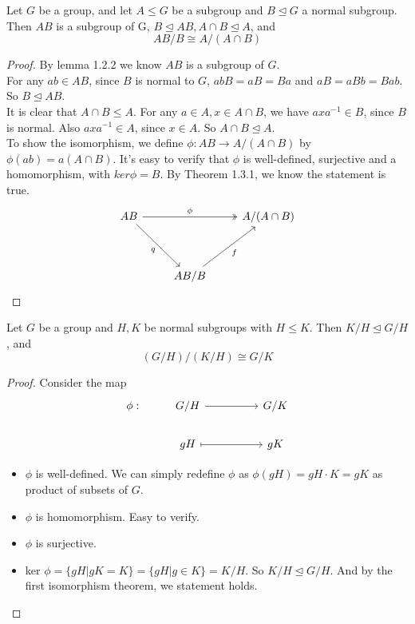 \documentclass[11pt,fleqn]{book} %
\begin{document}
\begin{CJK}{UTF8}{gkai}
\begin{theorem}
	 Let $G$ be a group, and let $A \leq G$ be a subgroup and $B \unlhd G$ a normal subgroup. Then $AB$ is a subgroup of G, $B \unlhd AB, A\cap B \unlhd A$, and 
	\[AB/B \cong A/(A\cap B)\]
\end{theorem}
\begin{proof}
	By lemma 1.2.2 we know $AB$ is a subgroup of $G$. \\
	For any $ab \in AB$, since $B$ is normal to $G$, $abB = aB = Ba$ and $aB = aBb = Bab$. So $B \unlhd AB$. \\
	It is clear that $A\cap B \leq A$. For any $a \in A, x \in A\cap B$, we have $axa^{-1} \in B$, since $B$ is normal. Also $axa^{-1} \in A$, since $x \in A$. So $A \cap B \unlhd A$. \\
	To show the isomorphism, we define $\phi: AB \to A/(A\cap B)$ by $\phi(ab) = a(A\cap B)$. It's easy to verify that $\phi$ is well-defined, surjective and a homomorphism, with $ker \phi = B$. By Theorem 1.3.1, we know the statement is true.
	\[\begin{tikzcd}
		AB && {A/(A\cap B)} \\
		\\
		& {AB/B}
		\arrow["\phi", two heads, from=1-1, to=1-3]
		\arrow["q"', from=1-1, to=3-2]
		\arrow["f"', from=3-2, to=1-3]
	\end{tikzcd}\]
\end{proof}

\begin{theorem}
	 Let $G$ be a group and $H, K$ be normal subgroups with $H \leq K$. Then $K/H \unlhd G/H$, and 
	\[(G/H)/(K/H) \cong G/K\] 
\end{theorem}
\begin{proof}
	Consider the map 
	\[\begin{tikzcd}
		{\phi:} & {G/H} && {G/K} \\
		& gH && gK
		\arrow[from=1-2, to=1-4]
		\arrow[maps to, from=2-2, to=2-4]
	\end{tikzcd}\]
	\begin{itemize}
		\item $\phi$ is well-defined. We can simply redefine $\phi$ as $\phi(gH) = gH\cdot K = gK$ as product of subsets of $G$.
		\item $\phi$ is homomorphism. Easy to verify.
		\item $\phi$ is surjective.
		\item ker $\phi = \{gH | gK = K\} = \{gH | g \in K\} = K/H$. So $K/H \unlhd G/H$. And by the first isomorphism theorem, we statement holds.  
	\end{itemize}
\end{proof}


\end{CJK}
\end{document}
